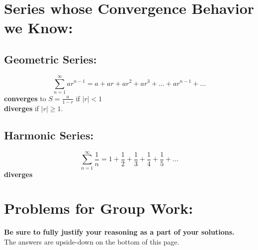 \documentclass[10pt]{article}
\begin{document}

\section*{Series whose Convergence Behavior we Know:}



\subsection*{Geometric Series:}
\[ \sum_{n=1}^\infty a r^{n-1} = a+ ar+ ar^2+ ar^3+ \ldots+ ar^{n-1}+\ldots \]
\textbf{converges} to \(S=\frac{a}{1-r}\) if \(|r|<1\)\\
 \textbf{diverges} if \(|r|\geq 1\).\\

\vspace*{.1in}
\vspace*{.2in}

\subsection*{Harmonic Series:} 
\[ \sum_{n=1}^\infty \frac{1}{n} = 1+\frac{1}{2}+\frac{1}{3}+\frac{1}{4}+\frac{1}{5}+\ldots \]
\textbf{diverges}






\pagebreak

\section*{Problems for Group Work:}
\textbf{Be sure to fully justify your reasoning as a part of your solutions.}\\
 The answers are upside-down on the bottom of this page.
\end{document}
